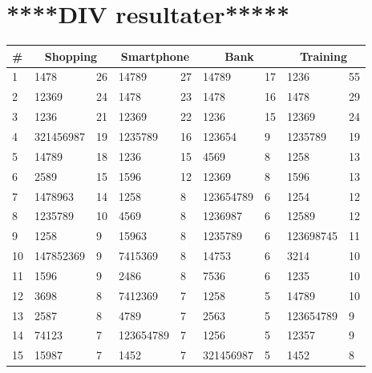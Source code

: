 
\section{****DIV resultater*****}

    \begin{table}[H]
	    \centering
	    \begin{tabular}{l || l l | l l | l l | l l }
	      \hline
	      {\bf \#} & \multicolumn{2}{c|}{\bf Shopping} & \multicolumn{2}{c|}{\bf Smartphone} & \multicolumn{2}{c|}{\bf Bank} & \multicolumn{2}{c}{\bf Training} \\ \hline
	      1  & 1478      & 26 & 14789      & 27 & 14789      & 17 & 1236       & 55 \\ 
	      2  & 12369     & 24 & 1478       & 23 & 1478       & 16 & 1478       & 29 \\
	      3  & 1236      & 21 & 12369      & 22 & 1236       & 15 & 12369      & 24 \\
	      4  & 321456987 & 19 & 1235789    & 16 & 123654     & 9  & 1235789    & 19 \\
	      5  & 14789     & 18 & 1236       & 15 & 4569       & 8  & 1258       & 13 \\
	      6  & 2589      & 15 & 1596       & 12 & 12369      & 8  & 1596       & 13 \\
	      7  & 1478963   & 14 & 1258       & 8  & 123654789  & 6  & 1254       & 12 \\
	      8  & 1235789   & 10 & 4569       & 8  & 1236987    & 6  & 12589      & 12 \\
	      9  & 1258      & 9  & 15963      & 8  & 1235789    & 6  & 123698745  & 11 \\
	      10 & 147852369 & 9  & 7415369    & 8  & 14753      & 6  & 3214       & 10 \\
	      11 & 1596      & 9  & 2486       & 8  & 7536       & 6  & 1235       & 10 \\
	      12 & 3698      & 8  & 7412369    & 7  & 1258       & 5  & 14789      & 10 \\
	      13 & 2587      & 8  & 4789       & 7  & 2563       & 5  & 123654789  & 9  \\
	      14 & 74123     & 7  & 123654789  & 7  & 1256       & 5  & 12357      & 9  \\
	      15 & 15987     & 7  & 1452       & 7  & 321456987  & 5  & 1452       & 8  \\

\end{tabular}
\end{table}
